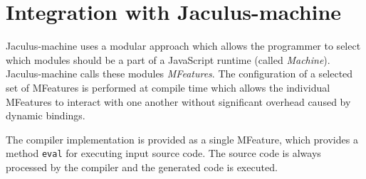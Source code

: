 \section{Integration with Jaculus-machine}

Jaculus-machine uses a modular approach which allows the programmer to select which modules should be a part of a JavaScript runtime (called \textit{Machine}). Jaculus-machine calls these modules \textit{MFeatures}. The configuration of a selected set of MFeatures is performed at compile time which allows the individual MFeatures to interact with one another without significant overhead caused by dynamic bindings.

The compiler implementation is provided as a single MFeature, which provides a method \texttt{eval} for executing input source code. The source code is always processed by the compiler and the generated code is executed.
